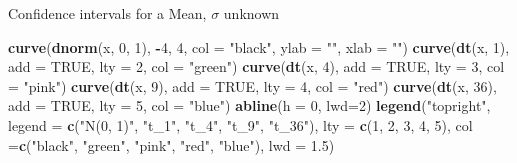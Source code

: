 \documentclass[
  ignorenonframetext,
]{beamer}
\newenvironment{Shaded}{\begin{snugshade}}{\end{snugshade}}
\newcommand{\AttributeTok}[1]{\textcolor[rgb]{0.13,0.29,0.53}{#1}}
\newcommand{\ConstantTok}[1]{\textcolor[rgb]{0.56,0.35,0.01}{#1}}
\newcommand{\DecValTok}[1]{\textcolor[rgb]{0.00,0.00,0.81}{#1}}
\newcommand{\FloatTok}[1]{\textcolor[rgb]{0.00,0.00,0.81}{#1}}
\newcommand{\FunctionTok}[1]{\textcolor[rgb]{0.13,0.29,0.53}{\textbf{#1}}}
\newcommand{\NormalTok}[1]{#1}
\newcommand{\SpecialCharTok}[1]{\textcolor[rgb]{0.81,0.36,0.00}{\textbf{#1}}}
\newcommand{\StringTok}[1]{\textcolor[rgb]{0.31,0.60,0.02}{#1}}
\begin{document}
\begin{frame}[fragile]{Confidence intervals for a Mean, \(\sigma\)
unknown}
\protect\hypertarget{confidence-intervals-for-a-mean-sigma-unknown-4}{}
\tiny

\begin{Shaded}
\begin{Highlighting}[]
\FunctionTok{curve}\NormalTok{(}\FunctionTok{dnorm}\NormalTok{(x, }\DecValTok{0}\NormalTok{, }\DecValTok{1}\NormalTok{), }\SpecialCharTok{{-}}\DecValTok{4}\NormalTok{, }\DecValTok{4}\NormalTok{, }\AttributeTok{col =} \StringTok{"black"}\NormalTok{, }\AttributeTok{ylab =} \StringTok{""}\NormalTok{, }\AttributeTok{xlab =} \StringTok{""}\NormalTok{)}
\FunctionTok{curve}\NormalTok{(}\FunctionTok{dt}\NormalTok{(x, }\DecValTok{1}\NormalTok{), }\AttributeTok{add =} \ConstantTok{TRUE}\NormalTok{, }\AttributeTok{lty =} \DecValTok{2}\NormalTok{, }\AttributeTok{col =} \StringTok{"green"}\NormalTok{)}
\FunctionTok{curve}\NormalTok{(}\FunctionTok{dt}\NormalTok{(x, }\DecValTok{4}\NormalTok{), }\AttributeTok{add =} \ConstantTok{TRUE}\NormalTok{, }\AttributeTok{lty =} \DecValTok{3}\NormalTok{, }\AttributeTok{col =} \StringTok{"pink"}\NormalTok{)}
\FunctionTok{curve}\NormalTok{(}\FunctionTok{dt}\NormalTok{(x, }\DecValTok{9}\NormalTok{), }\AttributeTok{add =} \ConstantTok{TRUE}\NormalTok{, }\AttributeTok{lty =} \DecValTok{4}\NormalTok{, }\AttributeTok{col =} \StringTok{"red"}\NormalTok{)}
\FunctionTok{curve}\NormalTok{(}\FunctionTok{dt}\NormalTok{(x, }\DecValTok{36}\NormalTok{), }\AttributeTok{add =} \ConstantTok{TRUE}\NormalTok{, }\AttributeTok{lty =} \DecValTok{5}\NormalTok{, }\AttributeTok{col =} \StringTok{"blue"}\NormalTok{)}
\FunctionTok{abline}\NormalTok{(}\AttributeTok{h =} \DecValTok{0}\NormalTok{, }\AttributeTok{lwd=}\DecValTok{2}\NormalTok{)}
\FunctionTok{legend}\NormalTok{(}\StringTok{"topright"}\NormalTok{, }\AttributeTok{legend =} \FunctionTok{c}\NormalTok{(}\StringTok{"N(0, 1)"}\NormalTok{, }\StringTok{"t\_1"}\NormalTok{, }\StringTok{"t\_4"}\NormalTok{, }\StringTok{"t\_9"}\NormalTok{, }\StringTok{"t\_36"}\NormalTok{), }\AttributeTok{lty =} \FunctionTok{c}\NormalTok{(}\DecValTok{1}\NormalTok{, }\DecValTok{2}\NormalTok{, }\DecValTok{3}\NormalTok{, }\DecValTok{4}\NormalTok{, }\DecValTok{5}\NormalTok{), }\AttributeTok{col =}\FunctionTok{c}\NormalTok{(}\StringTok{"black"}\NormalTok{, }\StringTok{"green"}\NormalTok{, }\StringTok{"pink"}\NormalTok{, }\StringTok{"red"}\NormalTok{, }\StringTok{"blue"}\NormalTok{), }\AttributeTok{lwd =} \FloatTok{1.5}\NormalTok{)}
\end{Highlighting}
\end{Shaded}


\end{frame}
\end{document}
